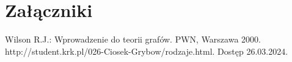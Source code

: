 \documentclass[12pt,twoside]{article}
\begin{document}
\clearpage

\section*{Załączniki}


\clearpage


\begin{thebibliography}{4}
 Wilson R.J.: Wprowadzenie do teorii grafów. PWN, Warszawa 2000.
 http://student.krk.pl/026-Ciosek-Grybow/rodzaje.html. Dostęp 26.03.2024.
\end{thebibliography}

\clearpage

\makesummary
\end{document}
